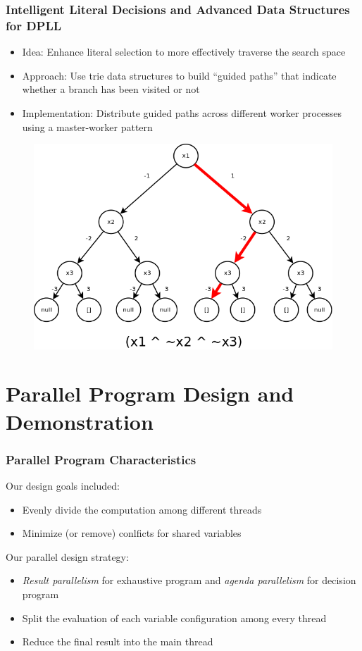 \documentclass[handout,10pt]{beamer}
\begin{document}
\begin{frame}
	\frametitle{Intelligent Literal Decisions and Advanced Data Structures for DPLL}
	\begin{itemize}
		\item Idea: Enhance literal selection to more effectively traverse the search space
		\item Approach: Use trie data structures to build ``guided paths'' that indicate whether a branch has been visited or not
		\item Implementation: Distribute guided paths across different worker processes using a master-worker pattern
	\end{itemize}
\begin{figure}
\centering
\includegraphics[scale = 0.2]{trie.png}
\end{figure}
\end{frame}

\section{Parallel Program Design and Demonstration}
\begin{frame}
	\frametitle{Parallel Program Characteristics}
	Our design goals included:
	\begin{itemize}
		\item Evenly divide the computation among different threads
		\item Minimize (or remove) conlficts for shared variables
	\end{itemize}

	\medskip

	Our parallel design strategy:
	\begin{itemize}
		\item \emph{Result parallelism} for exhaustive program and \emph{agenda parallelism} for decision program
		\item Split the evaluation of each variable configuration among every thread
		\item Reduce the final result into the main thread
	\end{itemize}
\end{frame}
\end{document}
